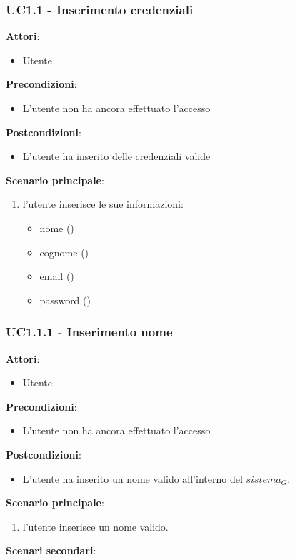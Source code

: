 \subsubsection{UC1.1 - Inserimento credenziali}\label{usecase:1_1}
\textbf{Attori}:
\begin{itemize}
    \item Utente
\end{itemize}
\textbf{Precondizioni}:
\begin{itemize}
    \item L'utente non ha ancora effettuato l'accesso
\end{itemize}
\textbf{Postcondizioni}:
\begin{itemize}
    \item L'utente ha inserito delle credenziali valide
\end{itemize}
\textbf{Scenario principale}:
\begin{enumerate}
    \item l'utente inserisce le sue informazioni:
    \begin{itemize}
        \item nome ()
        \item cognome ()
        \item email ()
        \item password ()
    \end{itemize}
\end{enumerate}

\subsubsection{UC1.1.1 - Inserimento nome}\label{usecase:1_1_1}
\textbf{Attori}:
\begin{itemize}
    \item Utente
\end{itemize}
\textbf{Precondizioni}:
\begin{itemize}
    \item L'utente non ha ancora effettuato l'accesso
\end{itemize}
\textbf{Postcondizioni}:
\begin{itemize}
    \item L'utente ha inserito un nome valido all'interno del $\textit{sistema}_G$.
\end{itemize}
\textbf{Scenario principale}:
\begin{enumerate}
    \item l'utente inserisce un nome valido.
\end{enumerate}
\textbf{Scenari secondari}:


